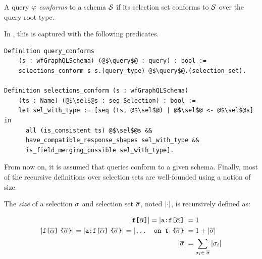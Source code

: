 \begin{definition}
A \gql query $\varphi$ \textit{conforms} to a schema $\mathcal{S}$ if its selection set conforms to $\mathcal{S}$ over the query root type.
\end{definition}


\noindent In \gcoql, this is captured with the following predicates.

\begin{verbatim}
Definition query_conforms 
    (s : wfGraphQLSchema) (@$\query$@ : query) : bool :=
    selections_conform s s.(query_type) @$\query$@.(selection_set).
    
Definition selections_conform (s : wfGraphQLSchema)
    (ts : Name) (@$\sel$@s : seq Selection) : bool :=
    let sel_with_type := [seq (ts, @$\sel$@) | @$\sel$@ <- @$\sel$@s] in 
      all (is_consistent ts) @$\sel$@s &&
      have_compatible_response_shapes sel_with_type &&
      is_field_merging_possible sel_with_type].
\end{verbatim}

From now on, it is assumed that queries conform to a given schema. Finally, most of the recursive definitions over selection sets are well-founded using a notion of size.
\begin{definition}[\cite{gqlph}]
The \emph{size} of a selection $\sigma$ and selection set $\overline{\sigma}$, noted $\lvert \cdot \rvert$, is recursively defined as:
\begin{small}
\begin{align*}
    \lvert \texttt{f[}\overline{\alpha}\texttt{]} \rvert  = \lvert \texttt{a:}\texttt{f[}\overline{\alpha}\texttt{]} \rvert &=  1\\
    \lvert \texttt{f[}\overline{\alpha}\texttt{]}\; \texttt{\{}\overline{\sigma}\texttt{\}} \rvert = \lvert \texttt{a:}\texttt{f[}\overline{\alpha}\texttt{]}\; \texttt{\{}\overline{\sigma}\texttt{\}} \rvert = \lvert \texttt{... on t \{}\overline{\sigma}\texttt{\}} \rvert &= 1 + \lvert \overline{\sigma} \rvert\\
    \lvert \overline{\sigma} \rvert &= \sum_{\sigma_{i} \in\; \overline{\sigma}}{\lvert \sigma_{i} \rvert}
    \end{align*}
\end{small}
\end{definition} 

